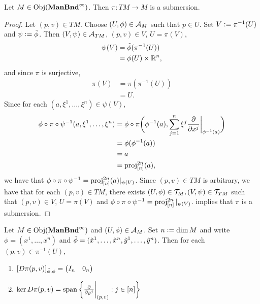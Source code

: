 \documentclass{book}
\begin{document}
\begin{ex}
	Let $M \in \operatorname{Obj}(\operatorname*{\text{\textbf{ManBnd}}^{\infty}})$. Then $\pi: TM \rightarrow M$ is a submersion.
\end{ex}

\begin{proof}
	Let $(p, v) \in TM$. Choose $(U, \phi) \in \mathcal{A}_M$ such that $p \in U$. Set $V \vcentcolon= \pi^{-1}(U)$ and $\psi \vcentcolon= \tilde{\phi}$. Then $(V, \psi) \in \mathcal{A}_{TM}$, $(p,v) \in V$, $U = \pi(V)$,
	\begin{align*}
		\psi(V) 
		& = \tilde{\phi}(\pi^{-1}(U)) \\
		& = \phi(U) \times \mathbb{R}^n,
	\end{align*}
	and since $\pi$ is surjective, 
	\begin{align*}
		\pi(V)
		& = \pi(\pi^{-1}(U)) \\
		& = U.
	\end{align*}
	Since for each $(a, \xi^1, \ldots, \xi^n) \in \psi(V)$,
	\begin{align*}
		\phi \circ \pi \circ \psi^{-1}(a, \xi^1, \ldots, \xi^n)
		& = \phi \circ \pi \bigg( \phi^{-1}(a), \sum\limits_{j=1}^n  \xi^j \frac{\partial}{\partial x^j} \bigg|_{\phi^{-1}(a)} \bigg) \\
		& = \phi(\phi^{-1}(a)) \\
		& = a \\
		& = \operatorname{\text{proj}}^{2n}_{[n]}(a),
	\end{align*}
	we have that $\phi \circ \pi \circ \psi^{-1} = \operatorname{\text{proj}}^{2n}_{[n]}(a)|_{\psi(V)}$. Since $(p, v) \in TM$ is arbitrary, we have that for each $(p,v) \in TM$, there exists $(U, \phi) \in \mathcal{T}_M, (V, \psi) \in \mathcal{T}_{TM}$ such that $(p,v) \in V$, $U = \pi(V)$ and $\phi \circ \pi \circ \psi^{-1} = \operatorname{\text{proj}}^{2n}_{[n]}|_{\psi(V)}$.  implies that $\pi$ is a submersion.
\end{proof}

\begin{ex}
	Let $M \in \operatorname{Obj}(\operatorname*{\text{\textbf{ManBnd}}^{\infty}})$ and $(U, \phi) \in \mathcal{A}_M$. Set $n \vcentcolon= \dim M$ and write $\phi = (x^1, \ldots, x^n)$ and $\tilde{\phi} = (\tilde{x}^1, \ldots, \tilde{x}^n, \tilde{y}^1, \ldots, \tilde{y}^n)$. Then for each $(p,v) \in \pi^{-1}(U)$,
	\begin{enumerate}
		\item $[D \pi (p,v)]_{\tilde{\phi}, \phi} = 
		\begin{pmatrix}
			I_n & 0_n
		\end{pmatrix}
		$
		\item $\ker D \pi (p,v) = \operatorname{span} \bigg\{ \frac{\partial}{\partial \tilde{y}^j} \bigg|_{(p,v)}: j \in [n] \bigg \}$
	\end{enumerate}
\end{ex}
\end{document}
